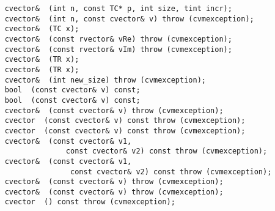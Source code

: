 \verb"    cvector& "\verb" (int n, const TC* p, int size, tint incr);"\\
\verb"    cvector& "\verb" (int n, const cvector& v) throw (cvmexception);"\\
\verb"    cvector& "\verb" (TC x);"\\
\verb"    cvector& "\verb" (const rvector& vRe) throw (cvmexception);"\\
\verb"    cvector& "\verb" (const rvector& vIm) throw (cvmexception);"\\
\verb"    cvector& "\verb" (TR x);"\\
\verb"    cvector& "\verb" (TR x);"\\
\verb"    cvector& "\verb" (int new_size) throw (cvmexception);"\\
\verb"    bool "\verb" (const cvector& v) const;"\\
\verb"    bool "\verb" (const cvector& v) const;"\\
\verb"    cvector& "\verb" (const cvector& v) throw (cvmexception);"\\
\verb"    cvector "\verb" (const cvector& v) const throw (cvmexception);"\\
\verb"    cvector "\verb" (const cvector& v) const throw (cvmexception);"\\
\verb"    cvector& "\verb" (const cvector& v1,"\\
\verb"                  const cvector& v2) const throw (cvmexception);"\\
\verb"    cvector& "\verb" (const cvector& v1,"\\
\verb"                   const cvector& v2) const throw (cvmexception);"\\
\verb"    cvector& "\verb" (const cvector& v) throw (cvmexception);"\\
\verb"    cvector& "\verb" (const cvector& v) throw (cvmexception);"\\
\verb"    cvector "\verb" () const throw (cvmexception);"\\
